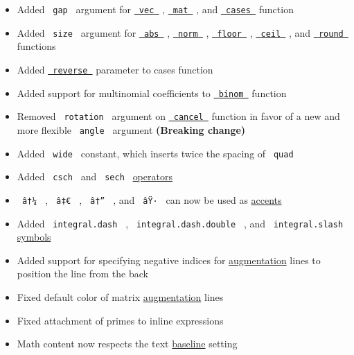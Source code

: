 \begin{itemize}
\tightlist
\item
  Added \texttt{\ gap\ } argument for
  \href{/docs/reference/math/vec/\#parameters-gap}{\texttt{\ vec\ }} ,
  \href{/docs/reference/math/mat/\#parameters-gap}{\texttt{\ mat\ }} ,
  and
  \href{/docs/reference/math/cases/\#parameters-gap}{\texttt{\ cases\ }}
  function
\item
  Added \texttt{\ size\ } argument for
  \href{/docs/reference/math/lr/\#functions-abs}{\texttt{\ abs\ }} ,
  \href{/docs/reference/math/lr/\#functions-norm}{\texttt{\ norm\ }} ,
  \href{/docs/reference/math/lr/\#functions-floor}{\texttt{\ floor\ }} ,
  \href{/docs/reference/math/lr/\#functions-ceil}{\texttt{\ ceil\ }} ,
  and
  \href{/docs/reference/math/lr/\#functions-round}{\texttt{\ round\ }}
  functions
\item
  Added
  \href{/docs/reference/math/cases/\#parameters-reverse}{\texttt{\ reverse\ }}
  parameter to cases function
\item
  Added support for multinomial coefficients to
  \href{/docs/reference/math/binom/}{\texttt{\ binom\ }} function
\item
  Removed \texttt{\ rotation\ } argument on
  \href{/docs/reference/math/cancel/}{\texttt{\ cancel\ }} function in
  favor of a new and more flexible \texttt{\ angle\ } argument
  \textbf{(Breaking change)}
\item
  Added \texttt{\ wide\ } constant, which inserts twice the spacing of
  \texttt{\ quad\ }
\item
  Added \texttt{\ csch\ } and \texttt{\ sech\ }
  \href{/docs/reference/math/op/}{operators}
\item
  \texttt{\ â†¼\ } , \texttt{\ â‡€\ } , \texttt{\ â†”\ } , and
  \texttt{\ âŸ·\ } can now be used as
  \href{/docs/reference/math/accent/}{accents}
\item
  Added \texttt{\ integral.dash\ } , \texttt{\ integral.dash.double\ } ,
  and \texttt{\ integral.slash\ }
  \href{/docs/reference/symbols/sym/}{symbols}
\item
  Added support for specifying negative indices for
  \href{/docs/reference/math/mat/\#parameters-augment}{augmentation}
  lines to position the line from the back
\item
  Fixed default color of matrix
  \href{/docs/reference/math/mat/\#parameters-augment}{augmentation}
  lines
\item
  Fixed attachment of primes to inline expressions
\item
  Math content now respects the text
  \href{/docs/reference/text/text/\#parameters-baseline}{baseline}
  setting
\end{itemize}

